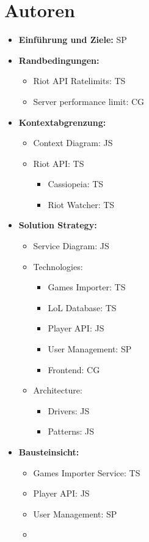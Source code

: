 \section{Autoren}
\begin{itemize}
\item
\textbf{Einführung und Ziele:} SP
\item
\textbf{Randbedingungen:}
	\begin{itemize}
	\item
	Riot API Ratelimits: TS
	\item
	Server performance limit: CG
	\end{itemize}
\item
\textbf{Kontextabgrenzung:}
	\begin{itemize}
	\item
	Context Diagram: JS
	\item
	Riot API: TS
	\begin{itemize}
		\item
		Cassiopeia: TS
		\item
		Riot Watcher: TS
	\end{itemize}
	\end{itemize}
\item
\textbf{Solution Strategy:}
\begin{itemize}
	\item
	Service Diagram: JS
	\item
	Technologies:
	\begin{itemize}
		\item
		Games Importer: TS
		\item
		LoL Database: TS
		\item
		Player API: JS
		\item
		User Management: SP
		\item
		Frontend: CG
	\end{itemize}
	\item
	Architecture:
	\begin{itemize}
		\item
		Drivers: JS
		\item
		Patterns: JS
	\end{itemize}
\end{itemize}
\item
\textbf{Bausteinsicht:}
\begin{itemize}
	\item
	Games Importer Service: TS
	\item
	Player API: JS
	\item
	User Management: SP
	\item 

\end{itemize}
\end{itemize}
